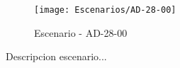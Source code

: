 \begin{figure}[H]
\centering
\texttt{[image: Escenarios/AD-28-00]}
\caption{Escenario - AD-28-00}
\label{fig:AD-28-00}
\end{figure}

Descripcion escenario...
\clearpage

